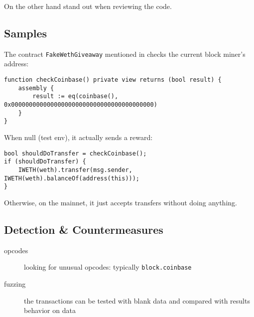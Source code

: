 On the other hand stand  out when reviewing the code.

\subsection{Samples}

The contract \lstinline{FakeWethGiveaway} mentioned in \cite{article-red-pill} checks the current block miner’s address:

\begin{lstlisting}[language=Solidity]
function checkCoinbase() private view returns (bool result) {
    assembly {
        result := eq(coinbase(), 0x0000000000000000000000000000000000000000)
    }
}
\end{lstlisting}

When null (test env), it actually sends a reward:

\begin{lstlisting}[language=Solidity]
bool shouldDoTransfer = checkCoinbase();
if (shouldDoTransfer) {
    IWETH(weth).transfer(msg.sender, IWETH(weth).balanceOf(address(this)));
}
\end{lstlisting}

Otherwise, on the mainnet, it just accepts transfers without doing anything.

\subsection{Detection \& Countermeasures}

\begin{description}
\item[opcodes]{looking for unusual opcodes: typically \lstinline[language=Solidity]{block.coinbase}}
\item[fuzzing]{the transactions can be tested with blank data and compared with results behavior on data}
\end{description}
